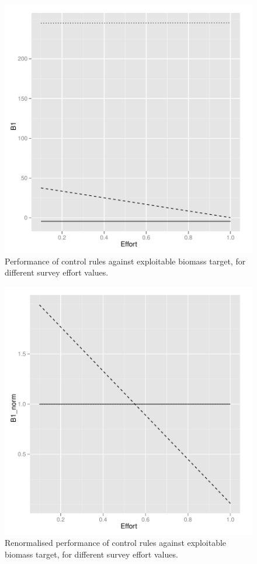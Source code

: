 \documentclass[a4paper]{article}
\begin{document}
\begin{figure}
\centering
\includegraphics{script-025}
\caption{Performance of control rules against exploitable biomass target, for different survey effort values.}
\label{fig:hcr_stoch_biomass}
\end{figure}

\begin{figure}
\centering
\includegraphics{script-026}
\caption{Renormalised performance of control rules against exploitable biomass target, for different survey effort values.}
\label{fig:hcr_stoch_biomass_norm}
\end{figure}
\end{document}
